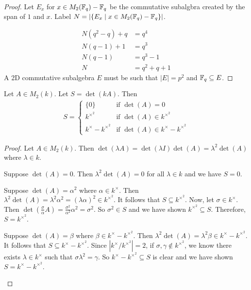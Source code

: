 \documentclass{amsart}
\begin{document}
\begin{proof}
    Let $E_x$ for $x \in M_2(\protect\mathbb{F}_q) - \protect\mathbb{F}_q$ be the commutative subalgbra created by the span of $1$ and $x$.
    Label $N = |\{E_x \mid x \in M_2(\protect\mathbb{F}_q) - \protect\mathbb{F}_q \}|$.

    \begin{align*}
        N(q^2 - q) + q &= q^4 \\
        N(q-1) + 1 &= q^3 \\
        N(q-1) &= q^3 - 1 \\
        N &= q^2 + q + 1
    \end{align*}
    A 2D commutative subalgebra $E$ must be such that $|E| = p^2$ and $\protect\mathbb{F}_q \subseteq E$.  
    
\end{proof}

\begin{lemma}
    Let $A \in M_2(k)$. Let $S = \det(kA)$. Then 
    \begin{align*}
        S =
        \begin{cases}
            \{0\}                     &\text{if } \det(A) = 0 \\
            k^{\times^2}              &\text{if } \det(A) \in k^{\times^2} \\
            k^{\times} - k^{\times^2} &\text{if } \det(A) \in k^{\times} - k^{\times^2}
        \end{cases}
    \end{align*}
\end{lemma}
\begin{proof}
    Let $A \in M_2(k)$. Then $\det(\lambda A) = \det(\lambda I)\det(A) = \lambda^2\det(A)$ where $\lambda \in k$. 
    \begin{Case}
        \item Suppose $\det(A) = 0$. Then $\lambda^2\det(A) = 0$ for all $\lambda \in k$ and we have $S = 0$.
        \item Suppose $\det(A) = \alpha^2$ where $\alpha \in k^{\times}$. Then $\lambda^2\det(A) = \lambda^2\alpha^2 = (\lambda\alpha)^2 \in k^{\times^2}$. It follows that $S \subseteq k^{\times^2}$. Now, let $\sigma \in k^{\times}$. Then $\det(\frac{\sigma}{\alpha}A) = \frac{\sigma^2}{\alpha^2}\alpha^2 = \sigma^2$. So $\sigma^2 \in S$ and we have shown $k^{\times^2} \subseteq S$. Therefore, $S = k^{\times^2}$.
        \item Suppose $\det(A) = \beta$ where $\beta \in k^{\times} - k^{\times^2}$. Then $\lambda^2\det(A) = \lambda^2\beta \in k^{\times} - k^{\times^2}$. It follows that $S \subseteq k^{\times} - k^{\times^2}$. Since $|k^{\times}/k^{\times^2}| = 2$, if $\sigma, \gamma \notin k^{\times^2}$, we know there exists $\lambda \in k^{\times}$ such that $\sigma\lambda^2 = \gamma$. So $k^{\times} - k^{\times^2} \subseteq S$ is clear and we have shown $S = k^{\times} - k^{\times^2}$.
    \end{Case}
\end{proof}
\end{document}
